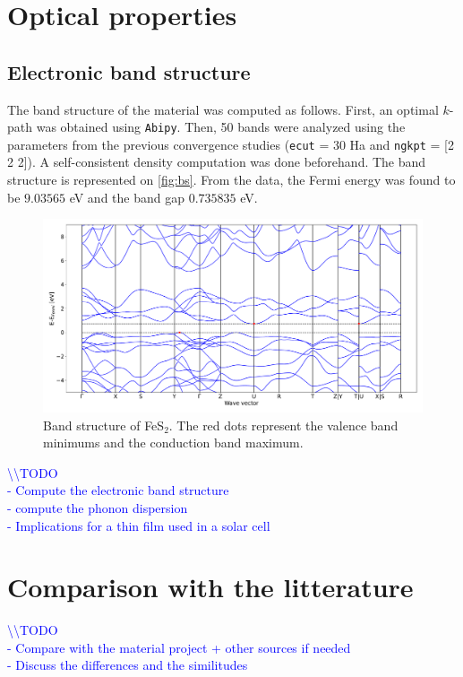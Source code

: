 \documentclass[11pt,a4paper]{article}
\begin{document}
\section{Optical properties}
\subsection{Electronic band structure}
The band structure of the material was computed as follows. First, an optimal $k$-path was obtained using \texttt{Abipy}. Then, 50 bands were analyzed using the parameters from the previous convergence studies (\texttt{ecut} = 30 Ha and \texttt{ngkpt} = [2 2 2]). A self-consistent density computation was done beforehand. The band structure is represented on \autoref{fig:bs}. From the data, the Fermi energy was found to be $9.03565$ eV and the band gap $0.735835$ eV.~
\begin{figure}[h]
\centering
\includegraphics[width=\textwidth]{images/bs.pdf}
\caption{Band structure of FeS$_2$. The red dots represent the valence band minimums and the conduction band maximum.}
\label{fig:bs}
\end{figure}
\textcolor{blue}{
\textbackslash\textbackslash TODO\\
- Compute the electronic band structure\\
- compute the phonon dispersion\\
- Implications for a thin film used in a solar cell}
\newpage
\section{Comparison with the litterature}
\textcolor{blue}{
\textbackslash\textbackslash TODO\\
- Compare with the material project + other sources if needed\\
- Discuss the differences and the similitudes}
\newpage
\end{document}
